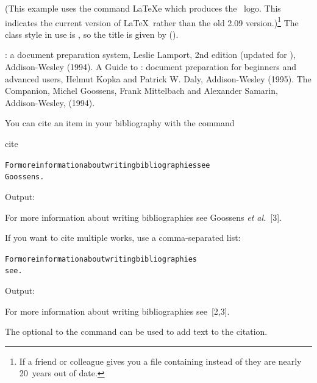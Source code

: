 (This example uses the command \gls{LaTeXe} which produces the
\LaTeXe\ logo. This indicates the current version of \LaTeX\ rather
than the old 2.09 version.)\footnote{If a friend or colleague gives
you a file containing  instead of 
they are nearly 20~years out of date.}
The class style in use is , so the title is
given by  ().
\begin{code}
\newline
{} : a document preparation 
system, Leslie Lamport, 2nd edition (updated for 
), Addison-Wesley (1994).\newline
\mbox{}\newline
{} A Guide to : document 
preparation for beginners and advanced users, 
Helmut Kopka and Patrick W. Daly, Addison-Wesley (1995).\newline
\mbox{}\newline
{} The 
Companion, 
Michel Goossens, Frank Mittelbach and
Alexander Samarin, Addison-Wesley, (1994).\newline
\mbox{}\newline
{}
\end{code}
\begin{result}
\dobibexamplenumbered
\end{result}

You can cite an item in your bibliography with the command
\begin{definition}
\gls{cite}
\end{definition}%

\bookpagebreak
{}
\begin{code}
\begin{alltt}
For more information about writing bibliographies see 
Goossens .
\end{alltt}
\end{code}%
Output:
\begin{resultS}
For more information about writing
bibliographies see 
Goossens \emph{et al.}~[3].
\end{resultS}
If you want to cite multiple works, use 
a comma-separated list:
\begin{code}
\begin{alltt}
For more information about writing bibliographies 
see.
\end{alltt}
\end{code}%
Output:
\begin{resultS}
For more information about writing bibliographies 
see~[2,3].
\end{resultS}
The \gls{optional}  to
the  command can be used to add text to the
citation.  

